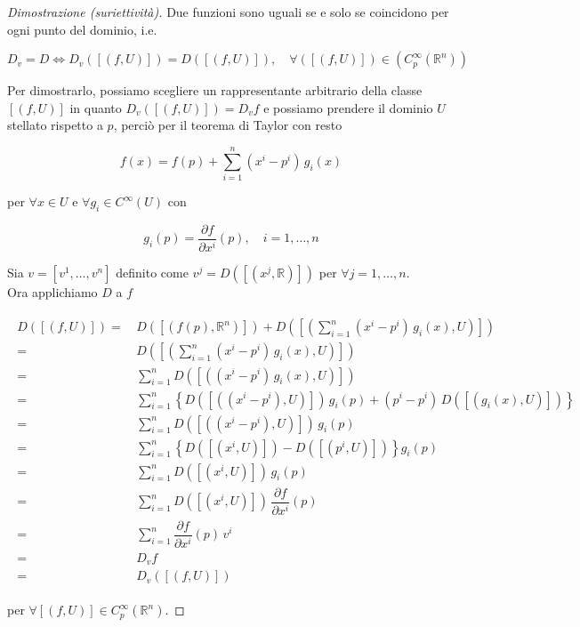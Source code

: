 \begin{proof}[Dimostrazione (suriettività)]
	Due funzioni sono uguali se e solo se coincidono per ogni punto del dominio, i.e.
	
	\begin{equation}
		D_{v} = D \iff D_{v}([(f,U)]) = D([(f,U)]), \quad \forall ([(f,U)]) \in (C_{p}^{\infty}(\mathbb{R}^{n}))
	\end{equation}

	Per dimostrarlo, possiamo scegliere un rappresentante arbitrario della classe $ [(f,U)] $ in quanto $ D_{v}([(f,U)]) = D_{v} f $ e possiamo prendere il dominio $ U $ stellato rispetto a $ p $, perciò per il teorema di Taylor con resto
	
	\begin{equation}
		f(x) = f(p) + \sum_{i=1}^{n} (x^{i}-p^{i}) \, g_{i}(x)
	\end{equation}

	per $ \forall x \in U $ e $ \forall g_{i} \in C^{\infty}(U) $ con
	
	\begin{equation}
		g_{i}(p) = \dfrac{\partial f}{\partial x^{i}} (p), \quad i=1,\dots,n
	\end{equation}

	Sia $ v = [v^{1},\dots,v^{n}] $ definito come $ v^{j} = D([(x^{j},\mathbb{R})]) $ per $ \forall j=1,\dots,n $.\\
	Ora applichiamo $ D $ a $ f $
	
	\begin{align}
		\begin{split}
			D ([(f,U)]) =& \, D ([(f(p),\mathbb{R}^{n})]) + D \left(\left[\left( \sum_{i=1}^{n} (x^{i}-p^{i}) \, g_{i}(x) , U \right)\right]\right)\\
			=& \, D \left(\left[\left( \sum_{i=1}^{n} (x^{i}-p^{i}) \, g_{i}(x) , U \right)\right]\right)\\
			=& \, \sum_{i=1}^{n} D ([( (x^{i}-p^{i}) \, g_{i}(x) , U )])\\
			=& \, \sum_{i=1}^{n} \left\{ D ([( (x^{i}-p^{i}), U )]) \, g_{i}(p) + (p^{i}-p^{i}) \, D ([( g_{i}(x), U )]) \right\}\\
			=& \, \sum_{i=1}^{n} D ([( (x^{i}-p^{i}), U )]) \, g_{i}(p)\\
			=& \, \sum_{i=1}^{n} \left\{ D ([( x^{i}, U )]) - D ([( p^{i}, U )]) \right\} g_{i}(p)\\
			=& \, \sum_{i=1}^{n} D ([( x^{i}, U )]) \, g_{i}(p)\\
			=& \, \sum_{i=1}^{n} D ([( x^{i}, U )]) \, \dfrac{\partial f}{\partial x^{i}} (p)\\
			=& \, \sum_{i=1}^{n} \dfrac{\partial f}{\partial x^{i}} (p) \, v^{i}\\
			=& \, D_{v} f\\
			=& \, D_{v} ([(f,U)])
		\end{split}
	\end{align}

	per $ \forall [(f,U)] \in C_{p}^{\infty}(\mathbb{R}^{n}) $.
\end{proof}

